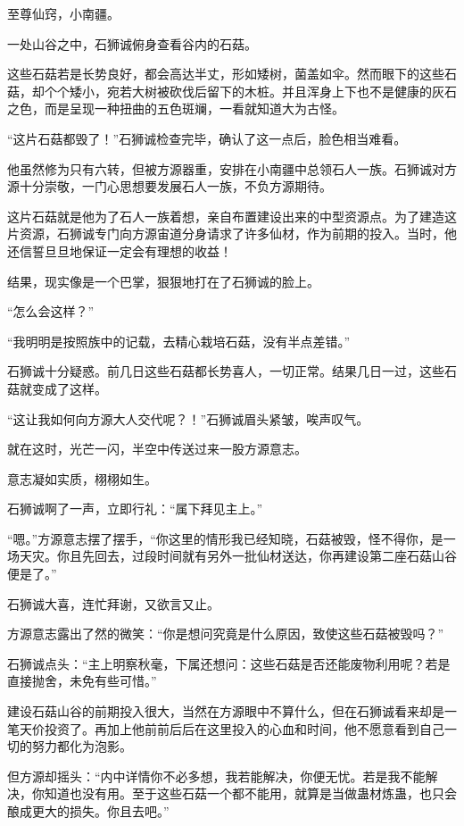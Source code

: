 
\begin{this_body}

至尊仙窍，小南疆。

一处山谷之中，石狮诚俯身查看谷内的石菇。

这些石菇若是长势良好，都会高达半丈，形如矮树，菌盖如伞。然而眼下的这些石菇，却个个矮小，宛若大树被砍伐后留下的木桩。并且浑身上下也不是健康的灰石之色，而是呈现一种扭曲的五色斑斓，一看就知道大为古怪。

“这片石菇都毁了！”石狮诚检查完毕，确认了这一点后，脸色相当难看。

他虽然修为只有六转，但被方源器重，安排在小南疆中总领石人一族。石狮诚对方源十分崇敬，一门心思想要发展石人一族，不负方源期待。

这片石菇就是他为了石人一族着想，亲自布置建设出来的中型资源点。为了建造这片资源，石狮诚专门向方源宙道分身请求了许多仙材，作为前期的投入。当时，他还信誓旦旦地保证一定会有理想的收益！

结果，现实像是一个巴掌，狠狠地打在了石狮诚的脸上。

“怎么会这样？”

“我明明是按照族中的记载，去精心栽培石菇，没有半点差错。”

石狮诚十分疑惑。前几日这些石菇都长势喜人，一切正常。结果几日一过，这些石菇就变成了这样。

“这让我如何向方源大人交代呢？！”石狮诚眉头紧皱，唉声叹气。

就在这时，光芒一闪，半空中传送过来一股方源意志。

意志凝如实质，栩栩如生。

石狮诚啊了一声，立即行礼：“属下拜见主上。”

“嗯。”方源意志摆了摆手，“你这里的情形我已经知晓，石菇被毁，怪不得你，是一场天灾。你且先回去，过段时间就有另外一批仙材送达，你再建设第二座石菇山谷便是了。”

石狮诚大喜，连忙拜谢，又欲言又止。

方源意志露出了然的微笑：“你是想问究竟是什么原因，致使这些石菇被毁吗？”

石狮诚点头：“主上明察秋毫，下属还想问：这些石菇是否还能废物利用呢？若是直接抛舍，未免有些可惜。”

建设石菇山谷的前期投入很大，当然在方源眼中不算什么，但在石狮诚看来却是一笔天价投资了。再加上他前前后后在这里投入的心血和时间，他不愿意看到自己一切的努力都化为泡影。

但方源却摇头：“内中详情你不必多想，我若能解决，你便无忧。若是我不能解决，你知道也没有用。至于这些石菇一个都不能用，就算是当做蛊材炼蛊，也只会酿成更大的损失。你且去吧。”


\end{this_body}

